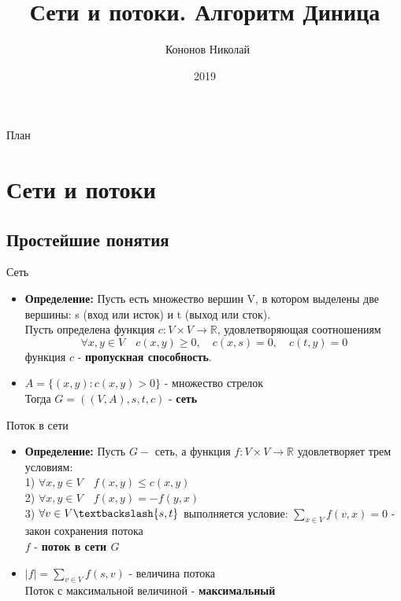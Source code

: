 \documentclass{beamer}
\title{Сети и потоки. Алгоритм Диница}
\author{~Кононов Николай}
\institute[СПБГУ]
{
    Математико-Механический факультет СПбГУ
}
\date{2019}
\begin{document}
\begin{frame}
  \titlepage
\end{frame}

\begin{frame}{План}
  \tableofcontents
\end{frame}


\section{Сети и потоки}

\subsection{Простейшие понятия}

\begin{frame}{Сеть}
  \begin{itemize}
  \item {
    \textbf{Определение: } Пусть есть множество вершин V, в котором выделены две вершины: s (вход или исток) и t (выход или сток). \\Пусть определена функция $c:V \times V \rightarrow \mathbb{R}$, удовлетворяющая соотношениям $$\forall x, y \in V \quad c(x, y) \geq 0, \quad c(x, s) = 0, \quad c(t, y) = 0 $$
    функция $c$ - \textbf{пропускная способность}.
    \pause
  }
  \item {
    $A = \{(x, y) : c(x, y) > 0\}$ - множество стрелок\\  Тогда $ G = ((V, A), s, t, c) $ - \textbf{сеть}
  }
  \end{itemize}
\end{frame}

\begin{frame}{Поток в сети}
  \begin{itemize}
  \item {
    \textbf{Определение: } Пусть $G - $ сеть, а функция $f:V \times V \rightarrow \mathbb{R}$ удовлетворяет трем условиям:\\
        1) $\forall x, y \in V \quad f(x, y) \leq c(x, y)$\\
        2) $\forall x, y \in V \quad f(x, y) = -f(y, x)$\\
        3) $\forall v \in V\textbackslash \{s, t\}$ выполняется условие: $ \sum\limits_{x \in V} f(v, x) = 0$ - закон сохранения потока
    \\ $f$ - \textbf{поток в сети $G$}
    \pause
  }
  \item {
    $ |f| = \sum\limits_{v \in V} f(s, v)$ - величина потока\\
        Поток с максимальной величиной - \textbf{максимальный}
  }
  \end{itemize}
\end{frame}
\end{document}
